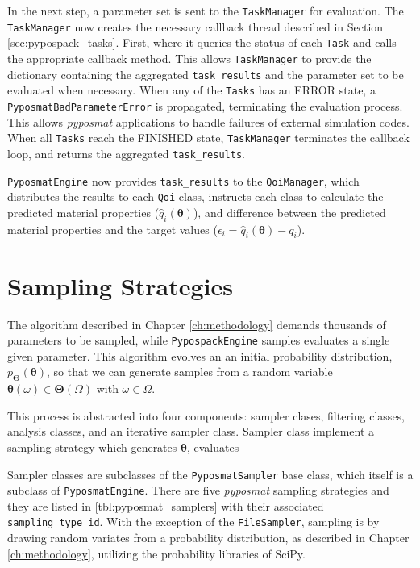 In the next step, a parameter set is sent to the \verb|TaskManager| for evaluation.  The \verb|TaskManager| now creates the necessary  callback thread described in Section \ref{sec:pypospack_tasks}.  First, where it queries the status of each \verb|Task| and calls the appropriate callback method.  This allows \verb|TaskManager| to provide the dictionary containing the aggregated \verb|task_results| and the parameter set to be evaluated when necessary.  When any of the \verb|Tasks| has an ERROR state, a \verb|PyposmatBadParameterError| is propagated, terminating the evaluation process.  This allows \emph{pyposmat} applications to handle failures of external simulation codes.  When all \verb|Tasks| reach the FINISHED state, \verb|TaskManager| terminates the callback loop, and returns the aggregated \verb|task_results|.

\verb|PyposmatEngine| now provides \verb|task_results| to the \verb|QoiManager|, which distributes the results to each \verb|Qoi| class, instructs each class to calculate the predicted material properties ($\hat{q}_i(\bm{\theta})$), and difference between the predicted material properties and the target values ($\epsilon_i = \hat{q}_i(\bm{\theta})-q_i$).

\section{Sampling Strategies}
\label{sec:software_sampling_strategies}

The algorithm described in Chapter \ref{ch:methodology} demands thousands of parameters to be sampled, while \verb|PypospackEngine| samples evaluates a single given parameter.  This algorithm evolves an an initial probability distribution, $p_{\bm{\Theta}}(\bm{\theta})$, so that we can generate samples from a random variable $\bm{\theta}(\omega) \in \bm{\Theta}(\Omega)$ with $\omega \in \Omega$.

This process is abstracted into four components: sampler clases, filtering classes, analysis classes, and an iterative sampler class.  Sampler class implement a sampling strategy which generates $\bm{\theta}$, evaluates

Sampler classes are subclasses of the \verb|PyposmatSampler| base class, which itself is a subclass of \verb|PyposmatEngine|.  There are five \emph{pyposmat} sampling strategies and they are listed in \ref{tbl:pyposmat_samplers} with their associated \verb|sampling_type_id|.  With the exception of the \verb|FileSampler|, sampling is by drawing random variates from a probability distribution, as described in Chapter \ref{ch:methodology}, utilizing the probability libraries of SciPy.

